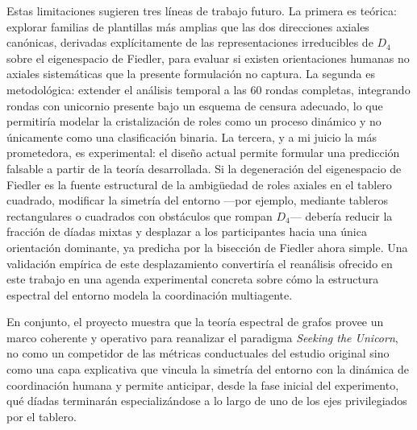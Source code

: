\documentclass[journal]{IEEEtran}
\begin{document}
Estas limitaciones sugieren tres líneas de trabajo futuro. La primera es teórica: explorar familias de plantillas más amplias que las dos direcciones axiales canónicas, derivadas explícitamente de las representaciones irreducibles de $D_4$ sobre el eigenespacio de Fiedler, para evaluar si existen orientaciones humanas no axiales sistemáticas que la presente formulación no captura. La segunda es metodológica: extender el análisis temporal a las 60 rondas completas, integrando rondas con unicornio presente bajo un esquema de censura adecuado, lo que permitiría modelar la cristalización de roles como un proceso dinámico y no únicamente como una clasificación binaria. La tercera, y a mi juicio la más prometedora, es experimental: el diseño actual permite formular una predicción falsable a partir de la teoría desarrollada. Si la degeneración del eigenespacio de Fiedler es la fuente estructural de la ambigüedad de roles axiales en el tablero cuadrado, modificar la simetría del entorno ---por ejemplo, mediante tableros rectangulares o cuadrados con obstáculos que rompan $D_4$--- debería reducir la fracción de díadas mixtas y desplazar a los participantes hacia una única orientación dominante, ya predicha por la bisección de Fiedler ahora simple. Una validación empírica de este desplazamiento convertiría el reanálisis ofrecido en este trabajo en una agenda experimental concreta sobre cómo la estructura espectral del entorno modela la coordinación multiagente.

En conjunto, el proyecto muestra que la teoría espectral de grafos provee un marco coherente y operativo para reanalizar el paradigma \emph{Seeking the Unicorn}, no como un competidor de las métricas conductuales del estudio original sino como una capa explicativa que vincula la simetría del entorno con la dinámica de coordinación humana y permite anticipar, desde la fase inicial del experimento, qué díadas terminarán especializándose a lo largo de uno de los ejes privilegiados por el tablero.
\end{document}
